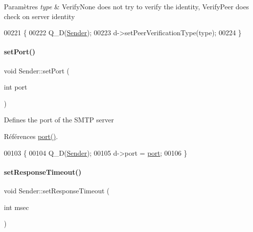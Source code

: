 \begin{DoxyParams}{Paramètres}
{\em type} & Verify\+None does not try to verify the identity, Verify\+Peer does check on server identity \\
\hline
\end{DoxyParams}

\begin{DoxyCode}
00221 \{
00222     Q\_D(\hyperlink{class_simple_mail_1_1_sender}{Sender});
00223     d->setPeerVerificationType(type);
00224 \}
\end{DoxyCode}
\mbox{\label{class_simple_mail_1_1_sender_a42eacd78ed9bef0f77215bce72cafe2d}} 
\paragraph{\texorpdfstring{set\+Port()}{setPort()}}
{\footnotesize\ttfamily void Sender\+::set\+Port (\begin{DoxyParamCaption}\item[{int}]{port }\end{DoxyParamCaption})}

Defines the port of the S\+M\+TP server 

Références \hyperlink{class_simple_mail_1_1_sender_a9c30e23e4b14333276af1a8b265ccb3c}{port()}.


\begin{DoxyCode}
00103 \{
00104     Q\_D(\hyperlink{class_simple_mail_1_1_sender}{Sender});
00105     d->port = \hyperlink{class_simple_mail_1_1_sender_a9c30e23e4b14333276af1a8b265ccb3c}{port};
00106 \}
\end{DoxyCode}
\mbox{\label{class_simple_mail_1_1_sender_ae2463b653e04e3c9321517a2cb3342bf}} 
\paragraph{\texorpdfstring{set\+Response\+Timeout()}{setResponseTimeout()}}
{\footnotesize\ttfamily void Sender\+::set\+Response\+Timeout (\begin{DoxyParamCaption}\item[{int}]{msec }\end{DoxyParamCaption})}

